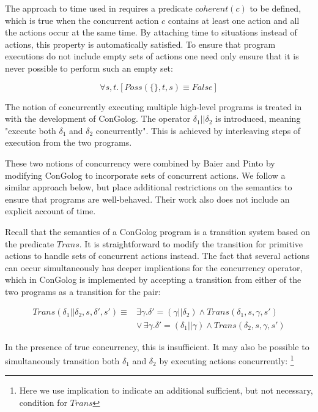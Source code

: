 \documentclass{llncs}
\begin{document}
The approach to time used in \cite{reiter96sc_nat_conc} requires
a predicate $coherent(c)$ to be defined, which is true when the concurrent
action $c$ contains at least one action and all the actions occur
at the same time. By attaching time to situations instead of actions,
this property is automatically satisfied. To ensure that program executions
do not include empty sets of actions one need only ensure that it
is never possible to perform such an empty set:

\[
\forall s,t.\left[Poss(\{\},t,s)\equiv False\right]
\]


The notion of concurrently executing multiple high-level programs
is treated in \cite{giacomo00congolog} with the development of ConGolog.
The operator $\delta_{1}||\delta_{2}$ is introduced, meaning "execute
both $\delta_{1}$ and $\delta_{2}$ concurrently". This is achieved
by interleaving steps of execution from the two programs.

These two notions of concurrency were combined by Baier and Pinto
\cite{pinto99tcongolog} by modifying ConGolog to incorporate sets
of concurrent actions. We follow a similar approach below, but place
additional restrictions on the semantics to ensure that programs are
well-behaved. Their work also does not include an explicit account
of time.

Recall that the semantics of a ConGolog program is a transition system
based on the predicate $Trans$. It is straightforward to modify the
transition for primitive actions to handle sets of concurrent actions
instead. The fact that several actions can occur simultaneously has
deeper implications for the concurrency operator, which in ConGolog
is implemented by accepting a transition from either of the two programs
as a transition for the pair:

\begin{align*}
Trans(\delta_{1}||\delta_{2},s,\delta',s')\equiv & \exists\gamma.\delta'=(\gamma||\delta_{2})\wedge Trans(\delta_{1},s,\gamma,s')\\
 & \vee\,\exists\gamma.\delta'=(\delta_{1}||\gamma)\wedge Trans(\delta_{2},s,\gamma,s')
\end{align*}


In the presence of true concurrency, this is insufficient. It may
also be possible to simultaneously transition both $\delta_{1}$ and
$\delta_{2}$ by executing actions concurrently:%
\footnote{Here we use implication to indicate an additional sufficient, but
not necessary, condition for $Trans$ %
}
\end{document}
